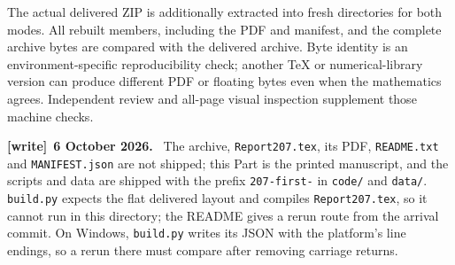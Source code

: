 \documentclass[11pt,letterpaper]{article}
\numberwithin{equation}{section}
\theoremstyle{remark}\newtheorem{remark}[theorem]{Remark}
\newcommand{\file}[1]{\nolinkurl{#1}}
\newenvironment{writenote}[1][]{\par\smallskip\begingroup\small
 \noindent\textbf{[write]}\if\relax\detokenize{#1}\relax\else~\textbf{#1.}\fi\ }%
 {\par\endgroup\smallskip}
\begin{document}
The actual delivered ZIP is additionally extracted into fresh directories for both modes. All rebuilt members, including the PDF and manifest, and the complete archive bytes are compared with the delivered archive. Byte identity is an environment-specific reproducibility check; another TeX or numerical-library version can produce different PDF or floating bytes even when the mathematics agrees. Independent review and all-page visual inspection supplement those machine checks.

\begin{writenote}[6 October 2026]
The archive, \file{Report207.tex}, its PDF, \file{README.txt} and \file{MANIFEST.json} are not shipped; this Part is the printed manuscript, and the scripts and data are shipped with the prefix \file{207-first-} in \file{code/} and \file{data/}. \texttt{build.py} expects the flat delivered layout and compiles \file{Report207.tex}, so it cannot run in this directory; the README gives a rerun route from the arrival commit. On Windows, \texttt{build.py} writes its JSON with the platform's line endings, so a rerun there must compare after removing carriage returns.
\end{writenote}
\end{document}
